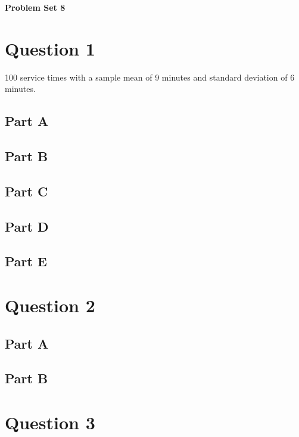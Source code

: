 \documentclass[letterpaper]{article}
\begin{document}
\vspace*{6pt}

\noindent \textbf{\huge{Problem Set 8}}

\bigskip

\section*{Question 1}

100 service times with a sample mean of 9 minutes and standard deviation of 6 minutes.

\subsection*{Part A}

\subsection*{Part B}

\subsection*{Part C}

\subsection*{Part D}

\subsection*{Part E}

\newpage

\section*{Question 2}

\subsection*{Part A}

\subsection*{Part B}

\newpage

\section*{Question 3}
\end{document}
